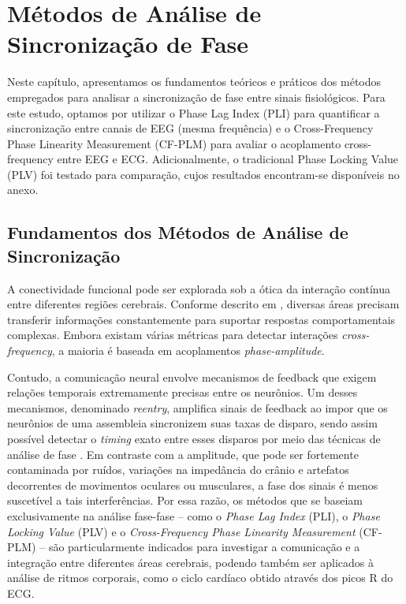 \chapter{Métodos de Análise de Sincronização de Fase}
\label{chap:6_metodos_de_analise_de_sincronizacao_de_fase}

Neste capítulo, apresentamos os fundamentos teóricos e práticos dos métodos empregados para analisar a sincronização de fase entre sinais fisiológicos. Para este estudo, optamos por utilizar o Phase Lag Index (PLI) para quantificar a sincronização entre canais de EEG (mesma frequência) e o Cross-Frequency Phase Linearity Measurement (CF-PLM) para avaliar o acoplamento cross-frequency entre EEG e ECG. Adicionalmente, o tradicional Phase Locking Value (PLV) foi testado para comparação, cujos resultados encontram-se disponíveis no anexo.

\section{Fundamentos dos Métodos de Análise de Sincronização}

A conectividade funcional pode ser explorada sob a ótica da interação contínua entre diferentes regiões cerebrais. Conforme descrito em \cite{sorrentino2022detection}, diversas áreas precisam transferir informações constantemente para suportar respostas comportamentais complexas. Embora existam várias métricas para detectar interações \textit{cross-frequency}, a maioria é baseada em acoplamentos \textit{phase-amplitude}.

Contudo, a comunicação neural envolve mecanismos de feedback que exigem relações temporais extremamente precisas entre os neurônios. Um desses mecanismos, denominado \emph{reentry}, amplifica sinais de feedback ao impor que os neurônios de uma assembleia sincronizem suas taxas de disparo, sendo assim possível detectar o \textit{timing} exato entre esses disparos por meio das técnicas de análise de fase \cite{seraj2018cerebral, ren2022multi}. Em contraste com a amplitude, que pode ser fortemente contaminada por ruídos, variações na impedância do crânio e artefatos decorrentes de movimentos oculares ou musculares, a fase dos sinais é menos suscetível a tais interferências. Por essa razão, os métodos que se baseiam exclusivamente na análise fase-fase – como o \textit{Phase Lag Index} (PLI), o \textit{Phase Locking Value} (PLV) e o \textit{Cross-Frequency Phase Linearity Measurement} (CF-PLM) – são particularmente indicados para investigar a comunicação e a integração entre diferentes áreas cerebrais, podendo também ser aplicados à análise de ritmos corporais, como o ciclo cardíaco obtido através dos picos R do ECG.

